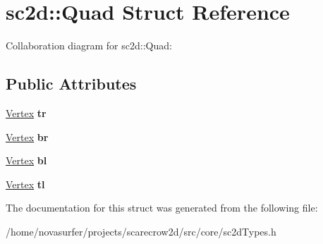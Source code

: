 \hypertarget{structsc2d_1_1Quad}{}\section{sc2d\+:\+:Quad Struct Reference}
\label{structsc2d_1_1Quad}


Collaboration diagram for sc2d\+:\+:Quad\+:
\subsection*{Public Attributes}
\begin{DoxyCompactItemize}
\item 
\mbox{\label{structsc2d_1_1Quad_a780fa9360b1f3266955712eba45d7a97}} 
\hyperlink{structsc2d_1_1Vertex}{Vertex} {\bfseries tr}
\item 
\mbox{\label{structsc2d_1_1Quad_a38bc4e538282453d933633870989569c}} 
\hyperlink{structsc2d_1_1Vertex}{Vertex} {\bfseries br}
\item 
\mbox{\label{structsc2d_1_1Quad_a7b36a9cd77ed9b645494e1e5b15ea98b}} 
\hyperlink{structsc2d_1_1Vertex}{Vertex} {\bfseries bl}
\item 
\mbox{\label{structsc2d_1_1Quad_a7c6b1532ddd46bb9f0993c769a0e66b3}} 
\hyperlink{structsc2d_1_1Vertex}{Vertex} {\bfseries tl}
\end{DoxyCompactItemize}


The documentation for this struct was generated from the following file\+:\begin{DoxyCompactItemize}
\item 
/home/novasurfer/projects/scarecrow2d/src/core/sc2d\+Types.\+h\end{DoxyCompactItemize}
